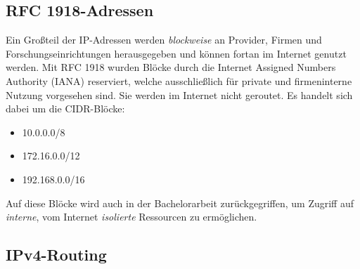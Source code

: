 \subsection{RFC 1918-Adressen}
Ein Großteil der IP-Adressen werden \textit{blockweise} an Provider, Firmen und Forschungseinrichtungen herausgegeben und können fortan im Internet genutzt werden. Mit \gls{RFC} 1918 wurden Blöcke durch die Internet Assigned Numbers Authority (IANA) reserviert, welche ausschließlich für private und firmeninterne Nutzung vorgesehen sind\cite{rfc1918}. Sie werden im Internet nicht geroutet. Es handelt sich dabei um die \gls{CIDR}-Blöcke:
\begin{itemize}
\item 10.0.0.0/8
\item 172.16.0.0/12
\item 192.168.0.0/16
\end{itemize}

Auf diese Blöcke wird auch in der Bachelorarbeit zurückgegriffen, um Zugriff auf \textit{interne}, vom Internet \textit{isolierte} Ressourcen zu ermöglichen.

\subsection{IPv4-Routing}

